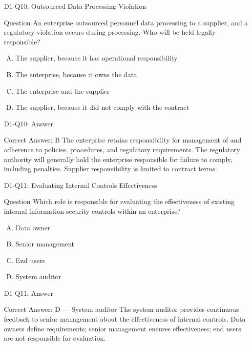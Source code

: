 \documentclass{beamer}
\begin{document}
	\begin{frame}{D1-Q10: Outsourced Data Processing Violation}
		\begin{block}{Question}
			An enterprise outsourced personnel data processing to a supplier, and a regulatory violation occurs during processing. Who will be held legally responsible?
		\end{block}
		\begin{enumerate}[(A)]
			\item The supplier, because it has operational responsibility
			\item The enterprise, because it owns the data
			\item The enterprise and the supplier
			\item The supplier, because it did not comply with the contract
		\end{enumerate}
	\end{frame}
	\begin{frame}{D1-Q10: Answer}
		\begin{block}{Correct Answer: B}
			The enterprise retains responsibility for management of and adherence to policies, procedures, and regulatory requirements. The regulatory authority will generally hold the enterprise responsible for failure to comply, including penalties. Supplier responsibility is limited to contract terms.
		\end{block}
	\end{frame}
	
	\begin{frame}{D1-Q11: Evaluating Internal Controls Effectiveness}
		\begin{block}{Question}
			Which role is responsible for evaluating the effectiveness of existing internal information security controls within an enterprise?
		\end{block}
		\begin{enumerate}[(A)]
			\item Data owner
			\item Senior management
			\item End users
			\item System auditor
		\end{enumerate}
	\end{frame}
	\begin{frame}{D1-Q11: Answer}
		\begin{block}{Correct Answer: D --- System auditor}
			The system auditor provides continuous feedback to senior management about the effectiveness of internal controls. Data owners define requirements; senior management ensures effectiveness; end users are not responsible for evaluation.
		\end{block}
	\end{frame}
	
\end{document}
